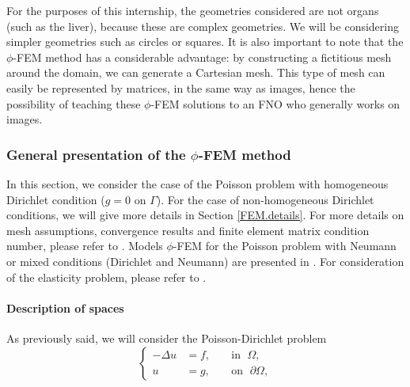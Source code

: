 \begin{Rem}
	For the purposes of this internship, the geometries considered are not organs (such as the liver), because these are complex geometries. We will be considering simpler geometries such as circles or squares. It is also important to note that the $\phi$-FEM method has a considerable advantage: by constructing a fictitious mesh around the domain, we can generate a Cartesian mesh. This type of mesh can easily be represented by matrices, in the same way as images, hence the possibility of teaching these $\phi$-FEM solutions to an FNO who generally works on images. 
\end{Rem}

\subsubsection{General presentation of the $\phi$-FEM method}

In this section, we consider the case of the Poisson problem with homogeneous Dirichlet condition ($g=0$ on $\Gamma$). For the case of non-homogeneous Dirichlet conditions, we will give more details in Section \ref{FEM.details}. For more details on mesh assumptions, convergence results and finite element matrix condition number, please refer to \cite{duprez_phi-fem_2020}. Models $\phi$-FEM for the Poisson problem with Neumann or mixed conditions (Dirichlet and Neumann) are presented in \cite{duprez_new_2023,cotin_phi-fem_nodate}. For consideration of the elasticity problem, please refer to \cite{cotin_phi-fem_nodate}.

\paragraph{Description of spaces} 


As previously said, we will consider the Poisson-Dirichlet problem
\begin{equation}
	\left\{
	\begin{aligned}
		-\Delta u &= f, \; &&\text{in } \; \Omega, \\
		u&=g, \; &&\text{on } \; \partial\Omega,
	\end{aligned}
	\right.
	\label{eq.Poisson}
\end{equation}

